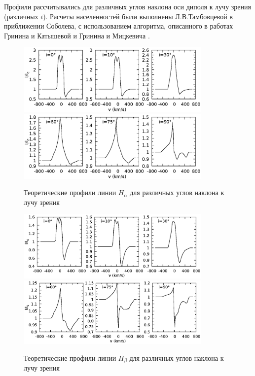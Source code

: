 \documentclass{article}
\begin{document}
Профили рассчитывались для различных углов наклона оси диполя к лучу зрения (различных $i$). Расчеты населенностей были выполнены Л.В.Тамбовцевой в приближении Соболева, с использованием алгоритма, описанного в работах Гринина и Катышевой \cite{grinin80} и Гринина и Мицкевича \cite{grinin90}.

\begin{figure} [!htb]
    \centering
    \includegraphics[width=0.85\textwidth]{Ha_0_10_30}
    \includegraphics[width=0.85\textwidth]{Ha_60_75_90}
    \caption{Теоретические профили линии $H_\alpha$ для различных углов наклона к лучу зрения}
\end{figure}

\begin{figure} [!htb]
    \centering
    \includegraphics[width=0.85\textwidth]{Hb_0_10_30}
    \includegraphics[width=0.85\textwidth]{Hb_60_75_90}
    \caption{Теоретические профили линии $H_\beta$ для различных углов наклона к лучу зрения}
\end{figure}
\end{document}
